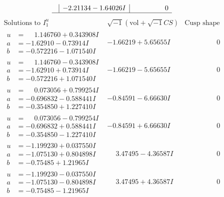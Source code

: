 \documentclass[1p]{elsarticle_modified}
\theoremstyle{definition}
\newcommand{\I}{\sqrt{-1}}
\begin{document}
$$\begin{array}{c|c|c}
 & -2.21134 - 1.64026 I & \phantom{-0.000000 } 0\\
 \hline 
 \end{array}$$\newpage$$\begin{array}{c|c|c}  
\text{Solutions to }I^u_{1}& \I (\text{vol} + \sqrt{-1}CS) & \text{Cusp shape}\\
 \hline 
\begin{aligned}
u &= \phantom{-}1.146760 + 0.343908 I \\
a &= -1.62910 - 0.73914 I \\
b &= -0.572216 - 1.071540 I\end{aligned}
 & -1.66219 + 5.65655 I & \phantom{-0.000000 } 0 \\ \hline\begin{aligned}
u &= \phantom{-}1.146760 - 0.343908 I \\
a &= -1.62910 + 0.73914 I \\
b &= -0.572216 + 1.071540 I\end{aligned}
 & -1.66219 - 5.65655 I & \phantom{-0.000000 } 0 \\ \hline\begin{aligned}
u &= \phantom{-}0.073056 + 0.799254 I \\
a &= -0.696832 - 0.588441 I \\
b &= -0.354850 + 1.227410 I\end{aligned}
 & -0.84591 - 6.66630 I & \phantom{-0.000000 } 0 \\ \hline\begin{aligned}
u &= \phantom{-}0.073056 - 0.799254 I \\
a &= -0.696832 + 0.588441 I \\
b &= -0.354850 - 1.227410 I\end{aligned}
 & -0.84591 + 6.66630 I & \phantom{-0.000000 } 0 \\ \hline\begin{aligned}
u &= -1.199230 + 0.037550 I \\
a &= -1.075130 + 0.804898 I \\
b &= -0.75485 + 1.21965 I\end{aligned}
 & \phantom{-}3.47495 - 4.36587 I & \phantom{-0.000000 } 0 \\ \hline\begin{aligned}
u &= -1.199230 - 0.037550 I \\
a &= -1.075130 - 0.804898 I \\
b &= -0.75485 - 1.21965 I\end{aligned}
 & \phantom{-}3.47495 + 4.36587 I & \phantom{-0.000000 } 0 \\ \hline\begin{aligned}

\end{aligned}
\end{array}$$
\end{document}
